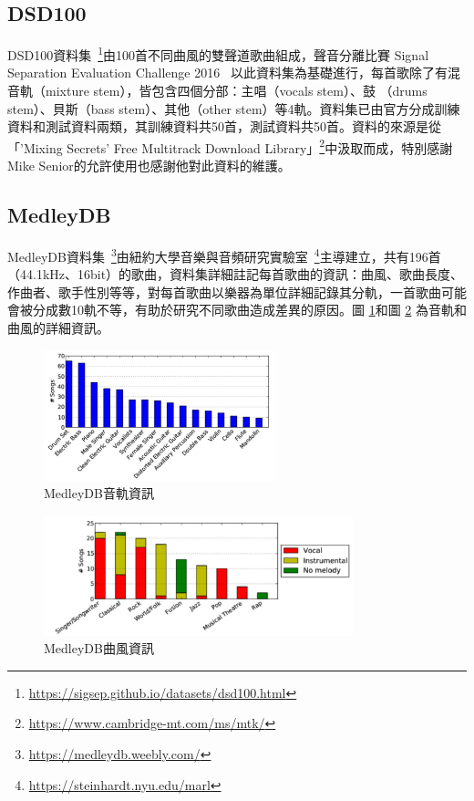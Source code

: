 \subsection{DSD100}
DSD100資料集~\cite{SiSEC16}\footnote{\url{https://sigsep.github.io/datasets/dsd100.html}}由100首不同曲風的雙聲道歌曲組成，聲音分離比賽 Signal Separation Evaluation Challenge 2016~\cite{liutkus20172016} 以此資料集為基礎進行，每首歌除了有混音軌（mixture stem），皆包含四個分部：主唱（vocals stem）、鼓 （drums stem）、貝斯（bass stem）、其他（other stem）等4軌。資料集已由官方分成訓練資料和測試資料兩類，其訓練資料共50首，測試資料共50首。資料的來源是從「'Mixing Secrets' Free Multitrack Download Library」\footnote{\url{https://www.cambridge-mt.com/ms/mtk/}}中汲取而成，特別感謝Mike Senior的允許使用也感謝他對此資料的維護。

\subsection{MedleyDB}
MedleyDB資料集~\cite{bittner2014medleydb}\footnote{\url{https://medleydb.weebly.com/}}由紐約大學音樂與音頻研究實驗室~\footnote{\url{https://steinhardt.nyu.edu/marl}}主導建立，共有196首（44.1kHz、16bit）的歌曲，資料集詳細註記每首歌曲的資訊：曲風、歌曲長度、作曲者、歌手性別等等，對每首歌曲以樂器為單位詳細記錄其分軌，一首歌曲可能會被分成數10軌不等，有助於研究不同歌曲造成差異的原因。圖 \ref{medleyDB_inst}和圖 \ref{medleyDB_genre} 為音軌和曲風的詳細資訊。

\begin{figure}[htbp]
    \centering
    \includegraphics[width=0.6\textwidth]{./figures/chapter03_dataset/medleyDB_inst.jpg}
    \caption{MedleyDB音軌資訊}
    \label{medleyDB_inst}
\end{figure}
\begin{figure}[htbp]
    \centering
    \includegraphics[width=0.8\textwidth]{./figures/chapter03_dataset/medleyDB_genre.jpg}
    \caption{MedleyDB曲風資訊}
    \label{medleyDB_genre}
\end{figure}


